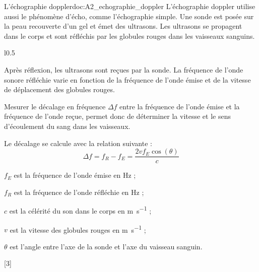 \begin{doc}{L'échographie doppler}{doc:A2_echographie_doppler}
  L'échographie doppler utilise aussi le phénomène d'écho, comme l'échographie simple.
  Une sonde est posée sur la peau recouverte d'un gel et émet des ultrasons.
  Les ultrasons se propagent dans le corps et sont réfléchis par les globules rouges dans les vaisseaux sanguins.

  \begin{wrapfigure}[10]{l}{0.5\linewidth}
    \centering
    \vspace*{-10pt}
  \end{wrapfigure}

  Après réflexion, les ultrasons sont reçues par la sonde.
  La fréquence de l'onde sonore réfléchie varie en fonction de la fréquence de l'onde émise et de la vitesse de déplacement des globules rouges.

  Mesurer le décalage en fréquence $\Delta f$ entre la fréquence de l'onde émise et la fréquence de l'onde reçue, permet donc de déterminer la vitesse et le sens d'écoulement du sang dans les vaisseaux.
  \vspace*{13pt}

  \begin{importants}
    Le décalage se calcule avec la relation suivante :
    \begin{equation*}
      \Delta f = f_R - f_E = \dfrac{2vf_E \cos(\theta)}{c}
    \end{equation*}
  \end{importants}
  
  \begin{listePoints}[2]
    \item $f_E$ est la fréquence de l'onde émise en \unit{\hertz} ;
    \item $f_R$ est la fréquence de l'onde réfléchie en \unit{\hertz} ;
    \item $c$ est la célérité du son dans le corps en \unit{\m\per\s} ;
    \item $v$ est la vitesse des globules rouges en \unit{\m\per\s} ;
    \item $\theta$ est l'angle entre l'axe de la sonde et l'axe du vaisseau sanguin.
  \end{listePoints}
\end{doc}


[3]


